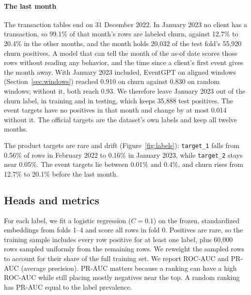 \documentclass[12pt]{article}
\newcommand{\tok}[1]{\texttt{#1}}
\begin{document}
\paragraph{The last month} The transaction tables end on 31 December 2022. In January 2023 no client has a transaction, so 99.1\% of that month's rows are labeled churn, against 12.7\% to 20.4\% in the other months, and the month holds 20,032 of the test fold's 55,920 churn positives. A model that can tell the month of the as-of date scores those rows without reading any behavior, and the time since a client's first event gives the month away. With January 2023 included, EventGPT on aligned windows (Section~\ref{sec:windows}) reached 0.910 on churn against 0.830 on random windows; without it, both reach 0.93. We therefore leave January 2023 out of the churn label, in training and in testing, which keeps 35,888 test positives. The event targets have no positives in that month and change by at most 0.014 without it. The official targets are the dataset's own labels and keep all twelve months.

The product targets are rare and drift (Figure~\ref{fig:labels}): \tok{target\_1} falls from 0.56\% of rows in February 2022 to 0.16\% in January 2023, while \tok{target\_2} stays near 0.05\%. The event targets lie between 0.01\% and 0.4\%, and churn rises from 12.7\% to 20.1\% before the last month.

\subsection{Heads and metrics}\label{sec:metrics}

For each label, we fit a logistic regression ($C = 0.1$) on the frozen, standardized embeddings from folds 1--4 and score all rows in fold 0. Positives are rare, so the training sample includes every row positive for at least one label, plus 60,000 rows sampled uniformly from the remaining rows. We reweight the sampled rows to account for their share of the full training set. We report ROC-AUC and PR-AUC (average precision). PR-AUC matters because a ranking can have a high ROC-AUC while still placing mostly negatives near the top. A random ranking has PR-AUC equal to the label prevalence.
\end{document}
